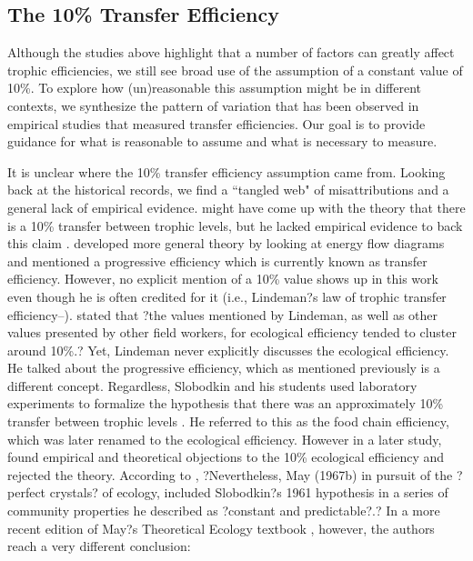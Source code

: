 \documentclass[oneside,12pt,final]{sty/ucthesis-CA2012}
\let\cite\citep                             %
\begin{document}
\begin{mainmatter}
\subsection{The 10\% Transfer Efficiency}
Although the studies above highlight that a number of factors can greatly affect trophic efficiencies, we still see broad use of the assumption of a constant value of 10\%. To explore how (un)reasonable this assumption might be in different contexts, we synthesize the pattern of variation that has been observed in empirical studies that measured transfer efficiencies. Our goal is to provide guidance for what is reasonable to assume and what is necessary to measure.

\vspace{5mm}

It is unclear where the 10\% transfer efficiency assumption came from. Looking back at the historical records, we find a ``tangled web" of misattributions and a general lack of empirical evidence. \citet{semper1881animal} might have come up with the theory that there is a 10\% transfer between trophic levels, but he lacked empirical evidence to back this claim \cite{mcintosh1986background}. \citet{lindeman1942trophic} developed more general theory by looking at energy flow diagrams and mentioned a progressive efficiency which is currently known as transfer efficiency. However, no explicit mention of a 10\% value shows up in this work even though he is often credited for it (i.e., Lindeman?s law of trophic transfer efficiency--\citealt{chapman1998ecology}). \citet{slobodkin1959energetics, slobodkin1972inconstancy} stated that ?the values mentioned by Lindeman, as well as other values presented by other field workers, for ecological efficiency tended to cluster around 10\%.? Yet, Lindeman never explicitly discusses the ecological efficiency. He talked about the progressive efficiency, which as mentioned previously is a different concept. Regardless, Slobodkin and his students used laboratory experiments to formalize the hypothesis that there was an approximately 10\% transfer between trophic levels \cite{slobodkin1959energetics}. He referred to this as the food chain efficiency, which was later renamed to the ecological efficiency. However in a later study, \citet{slobodkin1972inconstancy} found empirical and theoretical objections to the 10\% ecological efficiency and rejected the theory. According to \citet{mcintosh1986background}, ?Nevertheless, May (1967b) in pursuit of the ?perfect crystals? of ecology, included Slobodkin?s 1961 hypothesis in a series of community properties he described as ?constant and predictable?.? In a more recent edition of May?s Theoretical Ecology textbook , however, the authors reach a very different conclusion:


\end{mainmatter}
\end{document}
